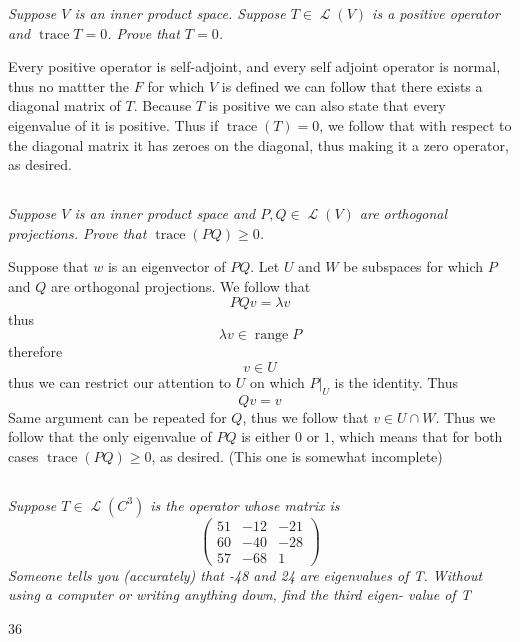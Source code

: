 \documentclass[11pt,oneside,titlepage]{book}
\DeclareMathOperator \map {\mathcal {L}}
\DeclareMathOperator \range {range}
\DeclareMathOperator \trace {trace}
\begin{document}
\textit{Suppose $V$ is an inner product space. Suppose $T \in \map(V)$ is a positive
  operator and $\trace T = 0$. Prove that $T =  0$.}

Every positive operator is self-adjoint, and every self adjoint operator is normal,
thus no mattter the $F$ for which $V$ is defined we can follow that there exists
a diagonal matrix of $T$. Because $T$ is positive we can also state that
every eigenvalue of it is positive. Thus if $\trace(T) = 0$, we follow that
with respect to the diagonal matrix it has zeroes on the diagonal, thus making
it a zero operator, as desired.

\subsection{}

\textit{Suppose $V$ is an inner product space and $P, Q \in \map(V)$ are orthogonal
  projections. Prove that $\trace(PQ) \geq 0$.}

Suppose that $w$ is an eigenvector of $PQ$. Let $U$ and $W$ be subspaces
for which $P$ and $Q$ are orthogonal projections. We follow that
$$PQv = \lambda v$$
thus
$$\lambda v \in \range P$$
therefore
$$v \in U$$
thus we can restrict our attention to $U$ on which $P|_U$ is the identity. Thus
$$Qv = v$$
Same argument can be repeated for $Q$, thus we follow that $v \in U \cap W$. Thus we
follow that the only eigenvalue of $PQ$ is either $0$ or $1$, which means that for both
cases $\trace(PQ) \geq 0$, as desired. (This one is somewhat incomplete)

\subsection{}

\textit{Suppose $T \in \map(C^3)$ is the operator whose matrix is
  $$
  \begin{pmatrix}
    51 & -12 & -21 \\
    60 & -40 & -28 \\
    57 & -68 & 1
  \end{pmatrix}
  $$
  Someone tells you (accurately) that -48 and 24 are eigenvalues of T.
  Without using a computer or writing anything down, find the third eigen-
  value of T}

36

\subsection{}
\end{document}
